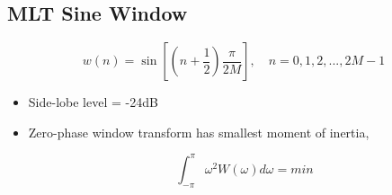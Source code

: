 \documentclass[11pt]{article}
\begin{document}
\subsection*{MLT Sine Window}\indent

\[w(n) = \sin[(n + \frac{1}{2}) \frac{\pi}{2M}],\quad n = 0, 1, 2, ..., 2M-1\]

\begin{itemize}
\item Side-lobe level = -24dB
\item Zero-phase window transform has smallest moment of inertia,

\[\int_{-\pi}^{\pi} \omega^2 W(\omega) d\omega = min\]

\end{itemize}
\end{document}
